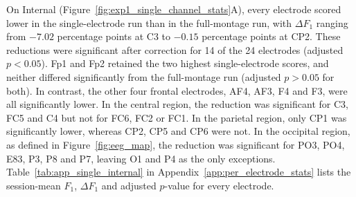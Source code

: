 On Internal (Figure~\ref{fig:exp1_single_channel_stats}A), every electrode scored lower in the single-electrode run than in the full-montage run, with $\Delta F_1$ ranging from $-7.02$ percentage points at C3 to $-0.15$ percentage points at CP2. These reductions were significant after correction for 14 of the 24 electrodes (adjusted $p < 0.05$). Fp1 and Fp2 retained the two highest single-electrode scores, and neither differed significantly from the full-montage run (adjusted $p > 0.05$ for both). In contrast, the other four frontal electrodes, AF4, AF3, F4 and F3, were all significantly lower. In the central region, the reduction was significant for C3, FC5 and C4 but not for FC6, FC2 or FC1. In the parietal region, only CP1 was significantly lower, whereas CP2, CP5 and CP6 were not. In the occipital region, as defined in Figure~\ref{fig:eeg_map}, the reduction was significant for PO3, PO4, E83, P3, P8 and P7, leaving O1 and P4 as the only exceptions. Table~\ref{tab:app_single_internal} in Appendix~\ref{app:per_electrode_stats} lists the session-mean $F_1$, $\Delta F_1$ and adjusted $p$-value for every electrode.
